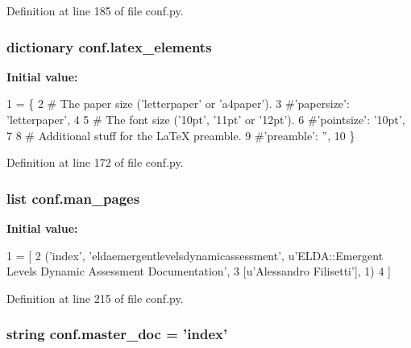 Definition at line 185 of file conf.\+py.

\hypertarget{a00134_a33619d385ad23765ac6ebb58bf82d43d}{
\subsubsection[{latex\+\_\+elements}]{\setlength{\rightskip}{0pt plus 5cm}dictionary conf.\+latex\+\_\+elements}}\label{a00134_a33619d385ad23765ac6ebb58bf82d43d}
{\bfseries Initial value\+:}
\begin{DoxyCode}
1 = \{
2 \textcolor{comment}{# The paper size ('letterpaper' or 'a4paper').}
3 \textcolor{comment}{#'papersize': 'letterpaper',}
4 
5 \textcolor{comment}{# The font size ('10pt', '11pt' or '12pt').}
6 \textcolor{comment}{#'pointsize': '10pt',}
7 
8 \textcolor{comment}{# Additional stuff for the LaTeX preamble.}
9 \textcolor{comment}{#'preamble': '',}
10 \}
\end{DoxyCode}


Definition at line 172 of file conf.\+py.

\hypertarget{a00134_a85efc5fee48a26fa2d651f6eeb38fc2b}{
\subsubsection[{man\+\_\+pages}]{\setlength{\rightskip}{0pt plus 5cm}list conf.\+man\+\_\+pages}}\label{a00134_a85efc5fee48a26fa2d651f6eeb38fc2b}
{\bfseries Initial value\+:}
\begin{DoxyCode}
1 = [
2     (\textcolor{stringliteral}{'index'}, \textcolor{stringliteral}{'eldaemergentlevelsdynamicassessment'}, \textcolor{stringliteral}{u'ELDA::Emergent Levels Dynamic Assessment
       Documentation'},
3      [\textcolor{stringliteral}{u'Alessandro Filisetti'}], 1)
4 ]
\end{DoxyCode}


Definition at line 215 of file conf.\+py.

\hypertarget{a00134_a6fcd7e5236f355b1e1a55f9d95988810}{
\subsubsection[{master\+\_\+doc}]{\setlength{\rightskip}{0pt plus 5cm}string conf.\+master\+\_\+doc = '{\bf index}'}}\label{a00134_a6fcd7e5236f355b1e1a55f9d95988810}


